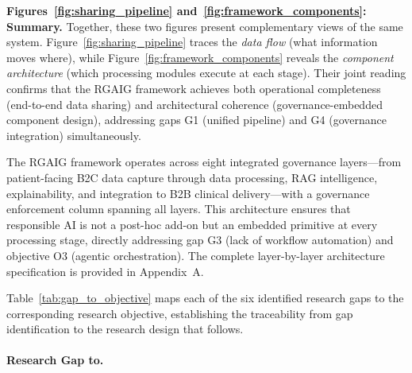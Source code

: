 \noindent\textbf{Figures~\ref{fig:sharing_pipeline} and~\ref{fig:framework_components}: Summary.} Together, these two figures present complementary views of the same system. Figure~\ref{fig:sharing_pipeline} traces the \textit{data flow} (what information moves where), while Figure~\ref{fig:framework_components} reveals the \textit{component architecture} (which processing modules execute at each stage). Their joint reading confirms that the RGAIG framework achieves both operational completeness (end-to-end data sharing) and architectural coherence (governance-embedded component design), addressing gaps G1 (unified pipeline) and G4 (governance integration) simultaneously.
\fi %

\label{sec:framework_components}
\label{fig:framework_components}

The RGAIG framework operates across eight integrated governance layers---from patient-facing B2C data capture through data processing, RAG intelligence, explainability, and integration to B2B clinical delivery---with a governance enforcement column spanning all layers. This architecture ensures that responsible AI is not a post-hoc add-on but an embedded primitive at every processing stage, directly addressing gap G3 (lack of workflow automation) and objective O3 (agentic orchestration). The complete layer-by-layer architecture specification is provided in Appendix~A.

\noindent Table~\ref{tab:gap_to_objective} maps each of the six identified research gaps to the corresponding research objective, establishing the traceability from gap identification to the research design that follows.

\paragraph{Research Gap to.}




